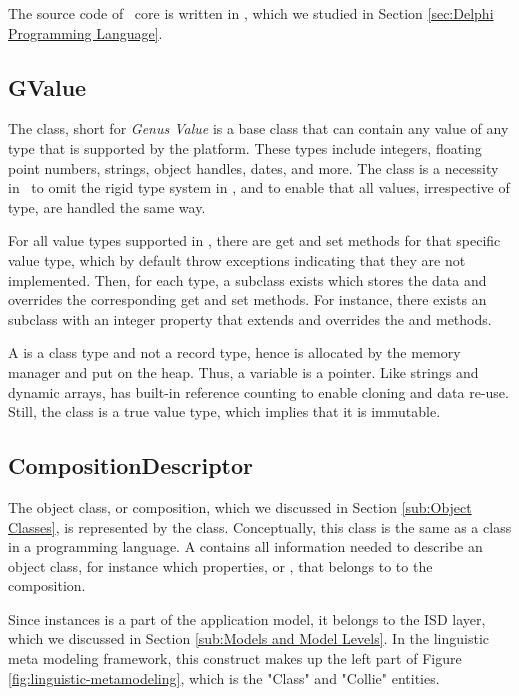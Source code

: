 The source code of \gap~core is written in \delphi, which we studied in Section \ref{sec:Delphi Programming Language}.

\subsection{GValue}
\label{sub:GValue}
The  class, short for \textit{Genus Value} is a base class that can contain any value of any type that is supported by the platform. These types include integers, floating point numbers, strings, object handles, dates, and more. The  class is a necessity in \gap~to omit the rigid type system in \delphi, and to enable that all values, irrespective of type, are handled the same way.

For all value types supported in \gap, there are get and set methods for that specific value type, which by default throw exceptions indicating that they are not implemented. Then, for each type, a subclass exists which stores the data and overrides the corresponding get and set methods. For instance, there exists an  subclass with an integer property that extends  and overrides the  and  methods. 

A  is a class type and not a record type, hence is allocated by the memory manager and put on the heap. Thus, a  variable is a pointer. Like strings and dynamic arrays,  has built-in reference counting to enable cloning and data re-use. Still, the class is a true value type, which implies that it is immutable.

\subsection{CompositionDescriptor}
\label{sub:CompositionDescriptor}
The object class, or composition, which we discussed in Section \ref{sub:Object Classes}, is represented by the  class. Conceptually, this class is the same as a class in a programming language. A  contains all information needed to describe an object class, for instance which properties, or , that belongs to to the composition.

Since  instances is a part of the application model, it belongs to the ISD layer, which we discussed in Section \ref{sub:Models and Model Levels}. In the linguistic meta modeling framework, this construct makes up the left part of Figure \ref{fig:linguistic-metamodeling}, which is the "Class" and "Collie" entities.

